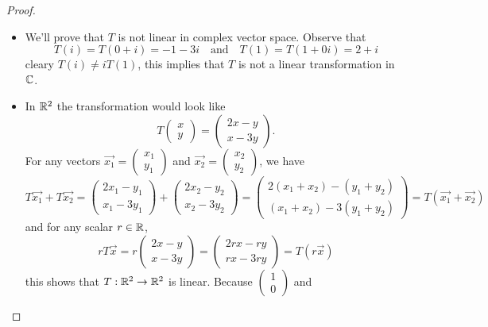 \begin{proof}
\begin{enumerate}
      \begin{itemize}
        \item We'll prove that $T$ is not linear in complex vector space.
          Observe that
          \[
            T(i)=T(0+i)=-1-3i
            \quad\text{and}\quad
            T(1)=T(1+0i)=2+i
          \]
          cleary $T(i)\neq iT(1)$, this implies that $T$ is 
          not a linear transformation in $\C$.
        \item 
          In $\R^2$ the transformation would look like
          \[
            T\begin{pmatrix}x\\y\end{pmatrix}=
            \begin{pmatrix}2x-y\\x-3y\end{pmatrix}.
          \]
          For any vectors
          $\vec{x_1}=\begin{pmatrix}x_1\\y_1\end{pmatrix}$ and
          $\vec{x_2}=\begin{pmatrix}x_2\\y_2\end{pmatrix}$, we have
          \[
            T\vec{x_1}+T\vec{x_2}=
            \begin{pmatrix}2x_1-y_1\\x_1-3y_1\end{pmatrix}+
            \begin{pmatrix}2x_2-y_2\\x_2-3y_2\end{pmatrix}=
            \begin{pmatrix}2(x_1+x_2)-(y_1+y_2)\\(x_1+x_2)-3(y_1+y_2)\end{pmatrix}=
            T(\vec{x_1}+\vec{x_2})
          \]
          and for any scalar $r\in\R$,
          \[
            rT\vec{x}=r\begin{pmatrix}2x-y\\x-3y\end{pmatrix}=
            \begin{pmatrix}2rx-ry\\rx-3ry\end{pmatrix}=
            T(r\vec{x})
          \]
          this shows that $T:\R^2\to\R^2$ is linear.
          Because $\begin{pmatrix} 1\\0 \end{pmatrix}$ and 

\end{itemize}
\end{enumerate}
\end{proof}
